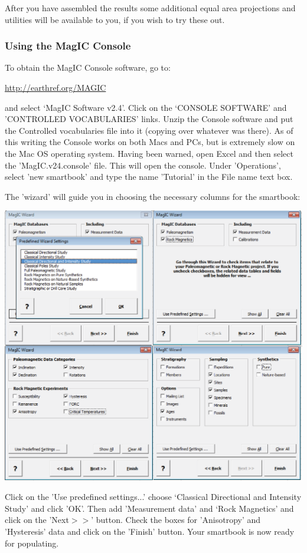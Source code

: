 \documentclass[11pt]{book}
\begin{document}
{{{  After you have assembled the results some additional equal area projections  and utilities will be available to you, if you wish to try these out.    
  
  \subsubsection{Using the MagIC Console}
 
  To obtain the MagIC Console software, go to:
  
   \url{http://earthref.org/MAGIC}
   
   \noindent and select `MagIC Software v2.4'.  Click on the `CONSOLE SOFTWARE' and  'CONTROLLED VOCABULARIES' links.  Unzip the Console software and put the Controlled vocabularies file into it (copying over whatever was there).  As of this writing the Console works on both Macs and PCs, but is extremely slow on the Mac OS operating system.  Having been warned,  open Excel and then select the 'MagIC.v24.console' file.  This will open the console.  Under 'Operations', select 'new smartbook' and type the name 'Tutorial' in the File name text box.  
  
  The 'wizard' will guide you in choosing the necessary columns for the smartbook:
  
  \includegraphics[width=15cm]{EPSFiles/wizard.eps}
  
\noindent  Click on the 'Use predefined settings...' choose 	 `Classical Directional and Intensity Study' and click 'OK'.  Then add 'Measurement data' and 	`Rock Magnetics' and click on the 'Next$>>$' button.  Check the boxes for 'Anisotropy' and 'Hysteresis' data and click on the  'Finish' button.  Your smartbook is now ready for populating.  
  
}}}
\end{document}
